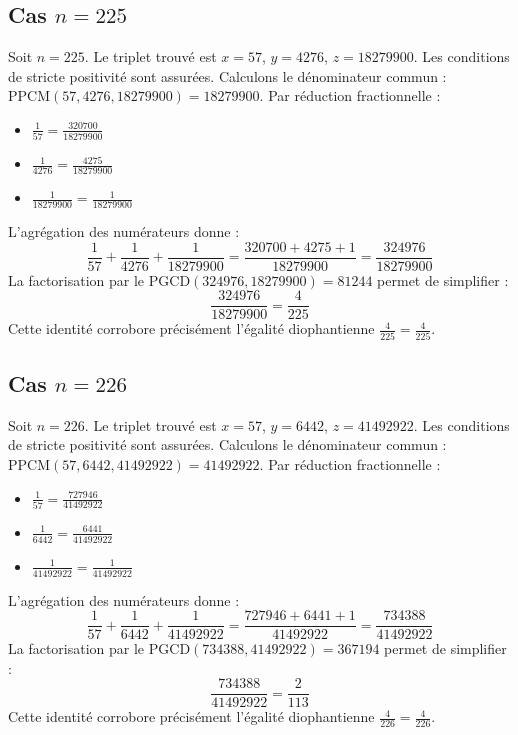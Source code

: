 \documentclass[11pt,a4paper]{article}
\begin{document}
\subsection{Cas $n = 225$}
Soit $n = 225$. Le triplet trouvé est $x = 57$, $y = 4276$, $z = 18279900$.
Les conditions de stricte positivité sont assurées.
Calculons le dénominateur commun : $\text{PPCM}(57, 4276, 18279900) = 18279900$.
Par réduction fractionnelle :
\begin{itemize}
    \item $\frac{1}{57} = \frac{320700}{18279900}$
    \item $\frac{1}{4276} = \frac{4275}{18279900}$
    \item $\frac{1}{18279900} = \frac{1}{18279900}$
\end{itemize}
L'agrégation des numérateurs donne :
$$ \frac{1}{57} + \frac{1}{4276} + \frac{1}{18279900} = \frac{320700 + 4275 + 1}{18279900} = \frac{324976}{18279900} $$
La factorisation par le $\text{PGCD}(324976, 18279900) = 81244$ permet de simplifier :
$$ \frac{324976}{18279900} = \frac{4}{225} $$
Cette identité corrobore précisément l'égalité diophantienne $\frac{4}{225} = \frac{4}{225}$.

\subsection{Cas $n = 226$}
Soit $n = 226$. Le triplet trouvé est $x = 57$, $y = 6442$, $z = 41492922$.
Les conditions de stricte positivité sont assurées.
Calculons le dénominateur commun : $\text{PPCM}(57, 6442, 41492922) = 41492922$.
Par réduction fractionnelle :
\begin{itemize}
    \item $\frac{1}{57} = \frac{727946}{41492922}$
    \item $\frac{1}{6442} = \frac{6441}{41492922}$
    \item $\frac{1}{41492922} = \frac{1}{41492922}$
\end{itemize}
L'agrégation des numérateurs donne :
$$ \frac{1}{57} + \frac{1}{6442} + \frac{1}{41492922} = \frac{727946 + 6441 + 1}{41492922} = \frac{734388}{41492922} $$
La factorisation par le $\text{PGCD}(734388, 41492922) = 367194$ permet de simplifier :
$$ \frac{734388}{41492922} = \frac{2}{113} $$
Cette identité corrobore précisément l'égalité diophantienne $\frac{4}{226} = \frac{4}{226}$.
\end{document}
